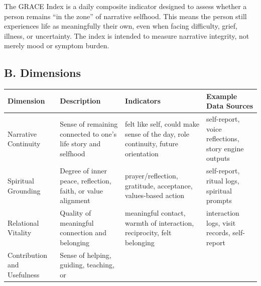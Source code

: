 \documentclass[
  journal,
]{IEEEtran}%
\newcounter{none} %
\begin{document}
The GRACE Index is a daily composite indicator designed to assess
whether a person remains ``in the zone'' of narrative selfhood. This
means the person still experiences life as meaningfully their own, even
when facing difficulty, grief, illness, or uncertainty. The index is
intended to measure narrative integrity, not merely mood or symptom
burden.

\subsection{B. Dimensions}\label{b.-dimensions}

\protect{}\label{tab-dimensions}
{\def\LTcaptype{none} %
\begin{longtable}[]{@{}
  >{\raggedright\arraybackslash}p{}
  >{\raggedright\arraybackslash}p{}
  >{\raggedright\arraybackslash}p{}
  >{\raggedright\arraybackslash}p{}@{}}
\toprule\noalign{}
\begin{minipage}[b]{\linewidth}\raggedright
Dimension
\end{minipage} & \begin{minipage}[b]{\linewidth}\raggedright
Description
\end{minipage} & \begin{minipage}[b]{\linewidth}\raggedright
Indicators
\end{minipage} & \begin{minipage}[b]{\linewidth}\raggedright
Example Data Sources
\end{minipage} \\
\midrule\noalign{}
\endhead
\bottomrule\noalign{}
\endlastfoot
Narrative Continuity & Sense of remaining connected to one's life story
and selfhood & felt like self, could make sense of the day, role
continuity, future orientation & self-report, voice reflections, story
engine outputs \\
Spiritual Grounding & Degree of inner peace, reflection, faith, or value
alignment & prayer/reflection, gratitude, acceptance, values-based
action & self-report, ritual logs, spiritual prompts \\
Relational Vitality & Quality of meaningful connection and belonging &
meaningful contact, warmth of interaction, reciprocity, felt belonging &
interaction logs, visit records, self-report \\
Contribution and Usefulness & Sense of helping, guiding, teaching, or

\end{longtable}}
\end{document}
